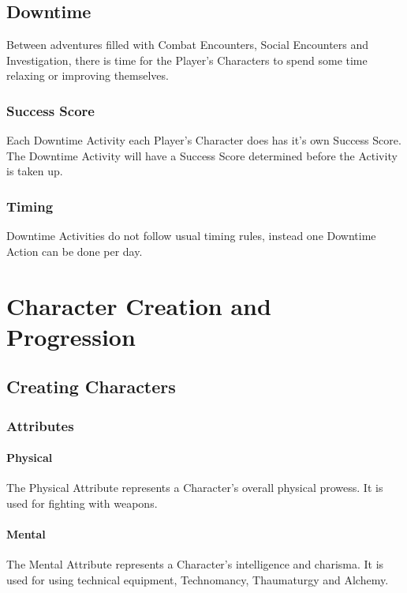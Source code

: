 \documentclass[a4paper,12pt,oneside]{book}
\begin{document}
        \section{Downtime}
            Between adventures filled with Combat Encounters, Social Encounters and Investigation, there is time for the Player's Characters to spend some time relaxing or improving themselves.

            \subsection{Success Score}
                Each Downtime Activity each Player's Character does has it's own Success Score. The Downtime Activity will have a Success Score determined before the Activity is taken up.

            \subsection{Timing}
                Downtime Activities do not follow usual timing rules, instead one Downtime Action can be done per day.

    \chapter{Character Creation and Progression}
        \section{Creating Characters}
            \subsection{Attributes}
                \subsubsection{Physical}
                    The Physical Attribute represents a Character's overall physical prowess. It is used for fighting with weapons.
                \subsubsection{Mental}
                    The Mental Attribute represents a Character's intelligence and charisma. It is used for using technical equipment, Technomancy, Thaumaturgy and Alchemy.
\end{document}
